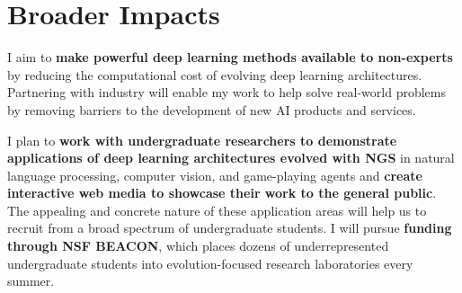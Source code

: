 \section{Broader Impacts}

I aim to \textbf{make powerful deep learning methods available to non-experts} by reducing the computational cost of evolving deep learning architectures.
Partnering with industry will enable my work to help solve real-world problems by removing barriers to the development of new AI products and services.

I plan to \textbf{work with undergraduate researchers to demonstrate applications of deep learning architectures evolved with NGS} in natural language processing, computer vision, and game-playing agents and \textbf{create interactive web media to showcase their work to the general public}.
The appealing and concrete nature of these application areas will help us to recruit from a broad spectrum of undergraduate students.
I will pursue \textbf{funding through NSF BEACON}, which places dozens of underrepresented undergraduate students into evolution-focused research laboratories every summer.
